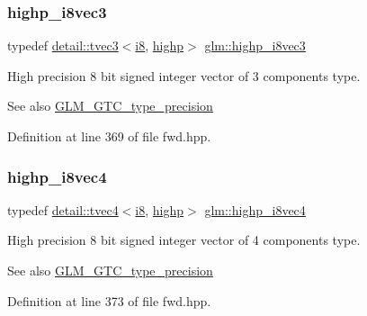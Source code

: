 \subsubsection{\texorpdfstring{highp\+\_\+i8vec3}{highp\_i8vec3}}
{\footnotesize\ttfamily typedef \hyperlink{structglm_1_1detail_1_1tvec3}{detail\+::tvec3}$<$\hyperlink{group__gtc__type__precision_gaae064be68b7d36cd7910c16e8ad18bba}{i8}, \hyperlink{namespaceglm_a0f04f086094c747d227af4425893f545ac6f7eab42eacbb10d59a58e95e362074}{highp}$>$ \hyperlink{group__gtc__type__precision_gad716792169ce7de963df25b865714438}{glm\+::highp\+\_\+i8vec3}}

High precision 8 bit signed integer vector of 3 components type. \begin{DoxySeeAlso}{See also}
\hyperlink{group__gtc__type__precision}{G\+L\+M\+\_\+\+G\+T\+C\+\_\+type\+\_\+precision} 
\end{DoxySeeAlso}


Definition at line 369 of file fwd.\+hpp.

\mbox{\label{group__gtc__type__precision_ga283b2f580a4bd7207d27418ef4a1068b}} 
\subsubsection{\texorpdfstring{highp\+\_\+i8vec4}{highp\_i8vec4}}
{\footnotesize\ttfamily typedef \hyperlink{structglm_1_1detail_1_1tvec4}{detail\+::tvec4}$<$\hyperlink{group__gtc__type__precision_gaae064be68b7d36cd7910c16e8ad18bba}{i8}, \hyperlink{namespaceglm_a0f04f086094c747d227af4425893f545ac6f7eab42eacbb10d59a58e95e362074}{highp}$>$ \hyperlink{group__gtc__type__precision_ga283b2f580a4bd7207d27418ef4a1068b}{glm\+::highp\+\_\+i8vec4}}

High precision 8 bit signed integer vector of 4 components type. \begin{DoxySeeAlso}{See also}
\hyperlink{group__gtc__type__precision}{G\+L\+M\+\_\+\+G\+T\+C\+\_\+type\+\_\+precision} 
\end{DoxySeeAlso}


Definition at line 373 of file fwd.\+hpp.

\mbox{\label{group__gtc__type__precision_gaf0430ed80e88c0d1dfbe47f359659c81}} 
